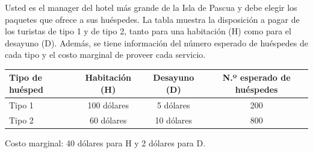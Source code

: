 \question Usted es el manager del hotel más grande de la Isla de Pascua y debe elegir los paquetes que ofrece a sus huéspedes. La tabla muestra la disposición a pagar de los turistas de tipo 1 y de tipo 2, tanto para una habitación (H) como para el desayuno (D). Además, se tiene información del número esperado de huéspedes de cada tipo y el costo marginal de proveer cada servicio.
\begin{center}
\begin{tabular}{lccc}
  Tipo de huésped & Habitación (H) & Desayuno (D) & N.º esperado de huéspedes \\ \hline
  Tipo 1 & 100 dólares & 5 dólares & 200 \\
  Tipo 2 & 60 dólares & 10 dólares & 800
\end{tabular}
\end{center}
Costo marginal: 40 dólares para H y 2 dólares para D.
